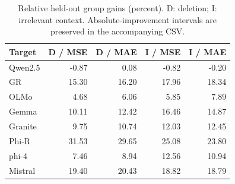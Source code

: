 \begin{table}[ht]
\caption{Relative held-out group gains (percent). D: deletion; I: irrelevant context. Absolute-improvement intervals are preserved in the accompanying CSV.}
\label{tab:all-gains}\centering\small
\begin{tabular}{lrrrr}\toprule
Target & D / MSE & D / MAE & I / MSE & I / MAE\\\midrule
Qwen2.5 & -0.87 & 0.08 & -0.82 & -0.20\\
GR & 15.30 & 16.20 & 17.96 & 18.34\\
OLMo & 4.68 & 6.06 & 5.85 & 7.89\\
Gemma & 10.11 & 12.42 & 16.46 & 14.87\\
Granite & 9.75 & 10.74 & 12.03 & 12.45\\
Phi-R & 31.53 & 29.65 & 25.08 & 23.80\\
phi-4 & 7.46 & 8.94 & 12.56 & 10.94\\
Mistral & 19.40 & 20.43 & 18.82 & 18.79\\
\bottomrule\end{tabular}\end{table}